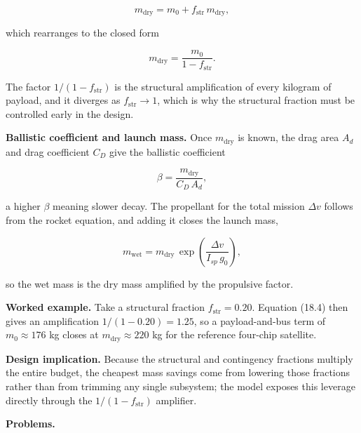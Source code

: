 \documentclass[
  11pt,
  openany,
  oneside]{book}
\begin{document}
\begin{equation}
m_{\mathrm{dry}} = m_0 + f_{\mathrm{str}}\,m_{\mathrm{dry}}, \tag{18.3}
\end{equation}

which rearranges to the closed form

\begin{equation}
m_{\mathrm{dry}} = \frac{m_0}{1 - f_{\mathrm{str}}}. \tag{18.4}
\end{equation}

The factor \(1/(1 - f_{\mathrm{str}})\) is the structural amplification
of every kilogram of payload, and it diverges as
\(f_{\mathrm{str}} \to 1\), which is why the structural fraction must be
controlled early in the design.

\textbf{Ballistic coefficient and launch mass.} Once
\(m_{\mathrm{dry}}\) is known, the drag area \(A_d\) and drag
coefficient \(C_D\) give the ballistic coefficient

\begin{equation}
\beta = \frac{m_{\mathrm{dry}}}{C_D\,A_d}, \tag{18.5}
\end{equation}

a higher \(\beta\) meaning slower decay. The propellant for the total
mission \(\Delta v\) follows from the rocket equation, and adding it
closes the launch mass,

\begin{equation}
m_{\mathrm{wet}} = m_{\mathrm{dry}}\,\exp\!\left(\frac{\Delta v}{I_{sp}\,g_0}\right), \tag{18.6}
\end{equation}

so the wet mass is the dry mass amplified by the propulsive factor.

\textbf{Worked example.} Take a structural fraction
\(f_{\mathrm{str}} = 0.20\). Equation (18.4) then gives an amplification
\(1/(1 - 0.20) = 1.25\), so a payload-and-bus term of
\(m_0 \approx 176\) kg closes at \(m_{\mathrm{dry}} \approx 220\) kg for
the reference four-chip satellite.

\textbf{Design implication.} Because the structural and contingency
fractions multiply the entire budget, the cheapest mass savings come
from lowering those fractions rather than from trimming any single
subsystem; the model exposes this leverage directly through the
\(1/(1 - f_{\mathrm{str}})\) amplifier.

\textbf{Problems.}
\end{document}
